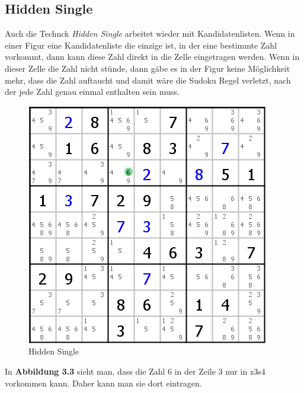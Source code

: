 \newpage
\subsection{Hidden Single}
Auch die Technck \textit{Hidden Single} arbeitet wieder mit Kandidatenlisten. Wenn in einer Figur eine Kandidatenliste die einzige ist, in der eine bestimmte Zahl vorkommt, dann kann diese Zahl direkt in die Zelle eingetragen werden. Wenn in dieser Zelle die Zahl nicht stünde, dann gäbe es in der Figur keine Möglichkeit mehr, dass die Zahl auftaucht und damit wäre die Sudoku Regel verletzt, nach der jede Zahl genau einmal enthalten sein muss.

\begin{figure}[h]
\begin{center}
\includegraphics{./img/hidden_single.png}
\caption{Hidden Single}
\end{center}
\end{figure}

In \textbf{Abbildung 3.3} sieht man, dass die Zahl 6 in der Zeile 3 nur in z3s4 vorkommen kann. Daher kann man sie dort eintragen.
